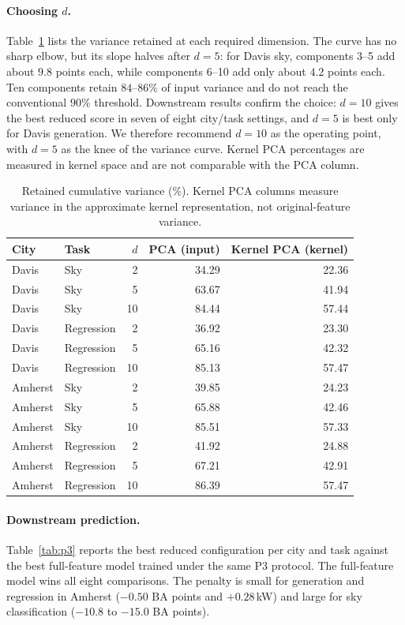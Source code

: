 \documentclass[11pt,letterpaper]{article}
\begin{document}
\paragraph{Choosing $d$.}
Table~\ref{tab:p3var} lists the variance retained at each required dimension. The curve has no
sharp elbow, but its slope halves after $d=5$: for Davis sky, components 3--5 add about $9.8$
points each, while components 6--10 add only about $4.2$ points each. Ten components retain
$84$--$86\%$ of input variance and do not reach the conventional $90\%$ threshold. Downstream
results confirm the choice: $d=10$ gives the best reduced score in seven of eight city/task
settings, and $d=5$ is best only for Davis generation. We therefore recommend $d=10$ as the
operating point, with $d=5$ as the knee of the variance curve. Kernel PCA percentages are
measured in kernel space and are not comparable with the PCA column.
\begin{table}[!htbp]\centering\footnotesize
\caption{Retained cumulative variance (\%). Kernel PCA columns measure variance in the approximate kernel representation, not original-feature variance.}\label{tab:p3var}
\begin{tabular}{@{}llrrr@{}}\toprule
\textbf{City} & \textbf{Task} & $d$ & \textbf{PCA (input)} & \textbf{Kernel PCA (kernel)}\\\midrule
Davis & Sky & 2 & 34.29 & 22.36\\
Davis & Sky & 5 & 63.67 & 41.94\\
Davis & Sky & 10 & 84.44 & 57.44\\
Davis & Regression & 2 & 36.92 & 23.30\\
Davis & Regression & 5 & 65.16 & 42.32\\
Davis & Regression & 10 & 85.13 & 57.47\\
Amherst & Sky & 2 & 39.85 & 24.23\\
Amherst & Sky & 5 & 65.88 & 42.46\\
Amherst & Sky & 10 & 85.51 & 57.33\\
Amherst & Regression & 2 & 41.92 & 24.88\\
Amherst & Regression & 5 & 67.21 & 42.91\\
Amherst & Regression & 10 & 86.39 & 57.47\\
\bottomrule\end{tabular}
\end{table}

\paragraph{Downstream prediction.}
Table~\ref{tab:p3} reports the best reduced configuration per city and task against the best
full-feature model trained under the same P3 protocol. The full-feature model wins all eight
comparisons. The penalty is small for generation and regression in Amherst ($-0.50$ BA points and
$+0.28$\,kW) and large for sky classification ($-10.8$ to $-15.0$ BA points).
\end{document}
